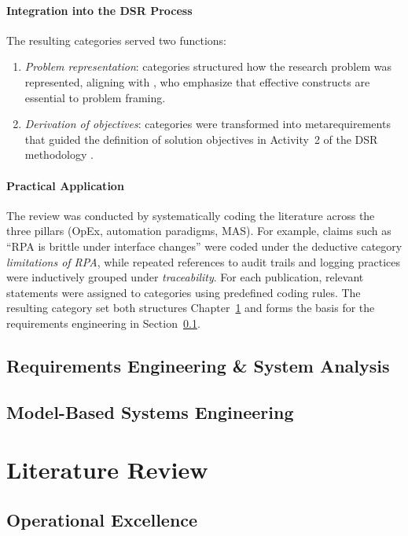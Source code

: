 \paragraph*{Integration into the DSR Process}
The resulting categories served two functions:
\begin{enumerate}
    \item \textit{Problem representation}: categories structured how the research problem was represented, aligning with \textcite{hevnerDesignScienceInformation2004}, who emphasize that effective constructs are essential to problem framing.
    \item \textit{Derivation of objectives}: categories were transformed into metarequirements that guided the definition of solution objectives in Activity~2 of the DSR methodology \parencite{peffersDesignScienceMethodology2007}.
\end{enumerate}

\paragraph*{Practical Application}
The review was conducted by systematically coding the literature across the three pillars (OpEx, automation paradigms, MAS). 
For example, claims such as ``RPA is brittle under interface changes'' were coded under the deductive category \emph{limitations of RPA}, 
while repeated references to audit trails and logging practices were inductively grouped under \emph{traceability}. 
For each publication, relevant statements were assigned to categories using predefined coding rules. 
The resulting category set both structures Chapter~\ref{sec:lit-rev} and forms the basis for the requirements engineering in Section~\ref{subsec:re-sa}.

\subsection{Requirements Engineering \& System Analysis}\label{subsec:re-sa}

\subsection{Model-Based Systems Engineering}\label{subsec:mbse}

\section{Literature Review}\label{sec:lit-rev}

\subsection{Operational Excellence}\label{subsec:op-ex}